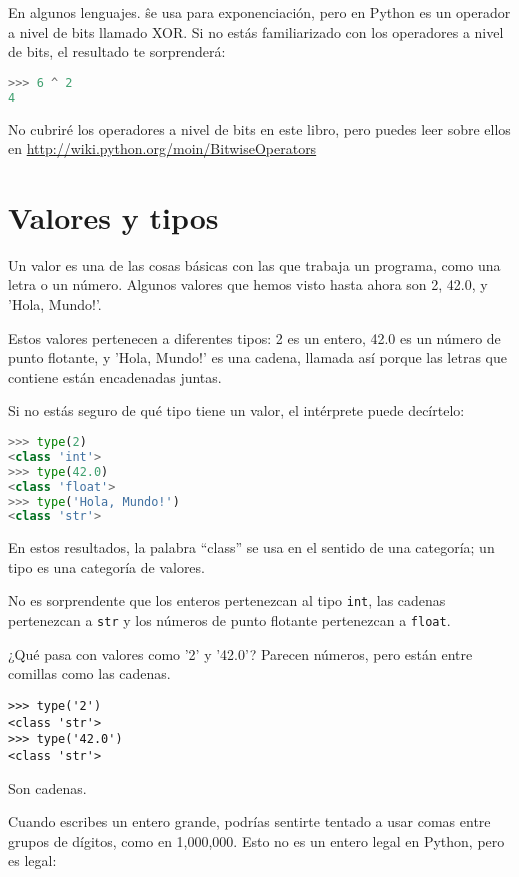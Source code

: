 \documentclass[12pt,letterpaper]{book}
\begin{document}
En algunos lenguajes. \^ se usa para exponenciación, pero en Python es un operador a nivel de bits llamado XOR. 
Si no estás familiarizado con los operadores a nivel de bits, el resultado te sorprenderá:

\begin{lstlisting}[language=Python, basicstyle=\ttfamily]
>>> 6 ^ 2
4
\end{lstlisting}

No cubriré los operadores a nivel de bits en este libro, pero puedes leer sobre ellos en \href{http://wiki.python.org/moin/BitwiseOperators}{http://wiki.python.org/moin/BitwiseOperators}

\section{Valores y tipos}
Un valor es una de las cosas básicas con las que trabaja un programa, como una letra o un número. Algunos valores que hemos visto hasta ahora son 2, 42.0, y 'Hola, Mundo!'. 

Estos valores pertenecen a diferentes tipos: 2 es un entero, 42.0 es un número de punto flotante, y 'Hola, Mundo!' es una cadena, llamada así porque las letras que contiene están encadenadas juntas.

Si no estás seguro de qué tipo tiene un valor, el intérprete puede decírtelo:

\begin{lstlisting}[language=Python, basicstyle=\ttfamily]
>>> type(2)
<class 'int'>
>>> type(42.0)
<class 'float'>
>>> type('Hola, Mundo!')
<class 'str'>
\end{lstlisting}

En estos resultados, la palabra ``class'' se usa en el sentido de una categoría; un tipo es una categoría de valores. 

No es sorprendente que los enteros pertenezcan al tipo \texttt{int}, las cadenas pertenezcan a \texttt{str} y los números de punto flotante pertenezcan a \texttt{float}.

¿Qué pasa con valores como '2' y '42.0'? Parecen números, pero están entre comillas como las cadenas.

\begin{lstlisting}
>>> type('2')
<class 'str'>
>>> type('42.0')
<class 'str'>
\end{lstlisting}

Son cadenas.

Cuando escribes un entero grande, podrías sentirte tentado a usar comas entre grupos de dígitos, como en 1,000,000. Esto no es un entero legal en Python, pero es legal:
\end{document}
